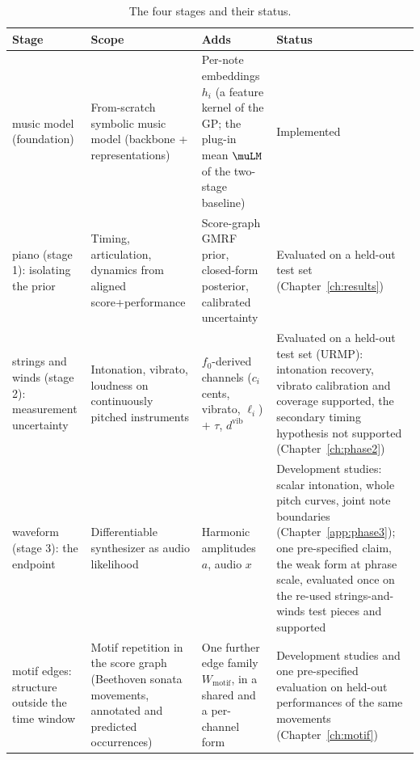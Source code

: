 \begin{table}[h]\centering
\caption{The four stages and their status.}
\label{tab:phases}
\footnotesize
\begin{tabular}{@{}p{2.6cm}p{3.8cm}p{3.7cm}p{3.4cm}@{}}
\toprule
Stage & Scope & Adds & Status \\
\midrule
music model (foundation) & From-scratch symbolic music model (backbone + representations) &
Per-note embeddings $h_i$ (a feature kernel of the GP; the plug-in mean $\muLM$ of the two-stage baseline) & Implemented \\
piano (stage 1): isolating the prior & Timing, articulation, dynamics from aligned score+performance &
Score-graph GMRF prior, closed-form posterior, calibrated uncertainty &
Evaluated on a held-out test set (Chapter~\ref{ch:results}) \\
strings and winds (stage 2): measurement uncertainty & Intonation, vibrato, loudness on continuously pitched instruments &
$f_0$-derived channels ($c_i$ cents, vibrato, $\ell_i$) $+$ $\tau$, $d^{\mathrm{vib}}$ & Evaluated on a held-out test set (URMP): intonation recovery, vibrato calibration and coverage supported, the secondary timing hypothesis not supported (Chapter~\ref{ch:phase2}) \\
waveform (stage 3): the endpoint & Differentiable synthesizer as audio likelihood &
Harmonic amplitudes $a$, audio $x$ & Development studies: scalar intonation, whole pitch curves, joint note boundaries (Chapter~\ref{app:phase3}); one pre-specified claim, the weak form at phrase scale, evaluated once on the re-used strings-and-winds test pieces and supported \\
motif edges: structure outside the time window & Motif repetition in the score graph (Beethoven sonata movements, annotated and predicted occurrences) &
One further edge family $W_{\mathrm{motif}}$, in a shared and a per-channel form & Development studies and one pre-specified evaluation on held-out performances of the same movements (Chapter~\ref{ch:motif}) \\
\bottomrule
\end{tabular}
\end{table}

